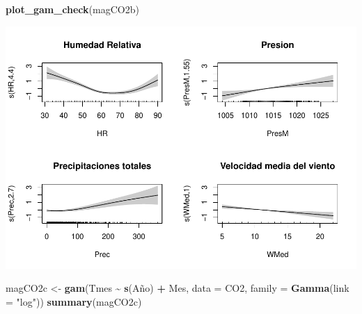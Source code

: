 \documentclass[12pt,a4paper,]{book}
\newenvironment{Shaded}{\begin{snugshade}}{\end{snugshade}}
\newcommand{\AttributeTok}[1]{\textcolor[rgb]{0.13,0.29,0.53}{#1}}
\newcommand{\FunctionTok}[1]{\textcolor[rgb]{0.13,0.29,0.53}{\textbf{#1}}}
\newcommand{\NormalTok}[1]{#1}
\newcommand{\OtherTok}[1]{\textcolor[rgb]{0.56,0.35,0.01}{#1}}
\newcommand{\SpecialCharTok}[1]{\textcolor[rgb]{0.81,0.36,0.00}{\textbf{#1}}}
\newcommand{\StringTok}[1]{\textcolor[rgb]{0.31,0.60,0.02}{#1}}
\numberwithin{dummy}{section}
\theoremstyle{ocrenumbox}
\theoremstyle{blacknumex}
\theoremstyle{blacknumbox}
\theoremstyle{ocrenum}
\theoremstyle{ocrenum}
\begin{document}
\begin{Shaded}
\begin{Highlighting}[]
\FunctionTok{plot\_gam\_check}\NormalTok{(magCO2b)}
\end{Highlighting}
\end{Shaded}

\begin{center}\includegraphics[width=0.95\linewidth]{figurasR/unnamed-chunk-28-1} \end{center}

\begin{Shaded}
\begin{Highlighting}[]
\NormalTok{magCO2c }\OtherTok{\textless{}{-}} \FunctionTok{gam}\NormalTok{(Tmes }\SpecialCharTok{\textasciitilde{}} \FunctionTok{s}\NormalTok{(Año) }\SpecialCharTok{+}\NormalTok{ Mes, }\AttributeTok{data =}\NormalTok{ CO2, }\AttributeTok{family =} \FunctionTok{Gamma}\NormalTok{(}\AttributeTok{link =} \StringTok{"log"}\NormalTok{))}
\FunctionTok{summary}\NormalTok{(magCO2c)}
\end{Highlighting}
\end{Shaded}
\end{document}
